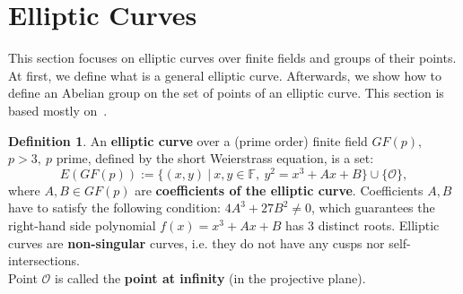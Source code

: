 \documentclass[thesis=M,english]{FITthesis}[2012/10/20]
\theoremstyle{remark}
\theoremstyle{definition}
\newtheorem{DF}{Definition}[section]
\begin{document}
\section{Elliptic Curves}
This section focuses on elliptic curves over finite fields and groups of their points. At first, we define what is a general elliptic curve. Afterwards, we show how to define an Abelian group on the set of points of an elliptic curve. This section is based mostly on~\cite{mky}.
\begin{DF}
An \textbf{elliptic curve} over a (prime order) finite field $GF(p),$ \\ $p > 3,\ p$ prime, defined by the short Weierstrass equation, is a set:
$$
E(GF(p)) := \{(x,y)\ |\ x,y \in \mathbb{F},\ y^2 = x^3 + Ax+B\} \cup \{ \mathcal{O} \},
$$
where $A, B \in GF(p)$ are \textbf{coefficients of the elliptic curve}. Coefficients $A,B$ have to satisfy the following condition: $4A^3 + 27B^2 \neq 0$, which guarantees the right-hand side polynomial $f(x)=x^3 + Ax+B$ has 3 distinct roots. Elliptic curves are \textbf{non-singular} curves, i.e. they do not have any cusps nor self-intersections. \\
\noindent Point $\mathcal{O}$ is called the \textbf{point at infinity} (in the projective plane).
\end{DF}
\end{document}
